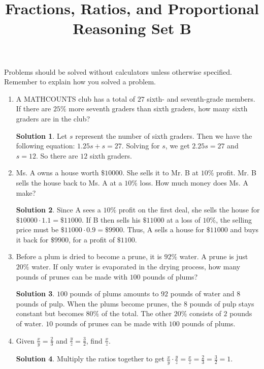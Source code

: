 \documentclass{article}
\title{Fractions, Ratios, and Proportional Reasoning Set B}
\author{}
\date{}
\theoremstyle{definition}
\newtheorem*{solution}{Solution}
\begin{document}
    \maketitle
    \noindent Problems should be solved without calculators unless otherwise specified. Remember to explain how you solved a problem.
    \begin{enumerate}
        \item A MATHCOUNTS club has a total of $27$ sixth- and seventh-grade members. If there are $25\%$ more seventh graders than sixth graders, how many sixth graders are in the club?
        \begin{solution}
            Let $s$ represent the number of sixth graders. Then we have the following equation: $1.25s + s = 27$. Solving for $s$, we get $2.25s = 27$ and $s = 12$. So there are $12$ sixth graders.
        \end{solution}
        \item Ms. A owns a house worth $\$10000$. She sells it to Mr. B at $10\%$ profit. Mr. B sells the house back to Ms. A at a $10\%$ loss. How much money does Ms. A make?
        \begin{solution}
            Since A sees a $10\%$ profit on the first deal, she sells the house for $\$10000 \cdot 1.1 = \$11000$. If B then sells his $\$11000$ at a loss of $10\%$, the selling price must be $\$11000 \cdot 0.9 = \$9900$. Thus, A sells a house for $\$11000$ and buys it back for $\$9900$, for a profit of $\$1100$.
        \end{solution}
        \item Before a plum is dried to become a prune, it is $92\%$ water. A prune is just $20\%$ water. If only water is evaporated in the drying process, how many pounds of prunes can be made with $100$ pounds of plums?
        \begin{solution}
            $100$ pounds of plums amounts to $92$ pounds of water and $8$ pounds of pulp. When the plums become prunes, the $8$ pounds of pulp stays constant but becomes $80\%$ of the total. The other $20\%$ consists of $2$ pounds of water. $10$ pounds of prunes can be made with $100$ pounds of plums.
        \end{solution}
        \item Given $\frac{x}{y} = \frac{2}{3}$ and $\frac{y}{z} = \frac{3}{2}$, find $\frac{x}{z}$.
        \begin{solution}
            Multiply the ratios together to get $\frac{x}{y} \cdot \frac{y}{z} = \frac{x}{z} = \frac{2}{3} = \frac{3}{2} = 1$.

\end{solution}
\end{enumerate}
\end{document}
